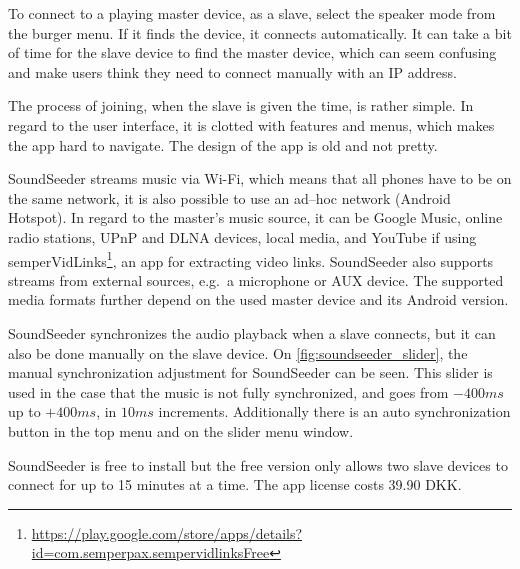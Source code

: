 To connect to a playing master device, as a slave, select the speaker mode from the burger menu.
If it finds the device, it connects automatically.
It can take a bit of time for the slave device to find the master device, which can seem confusing and make users think they need to connect manually with an IP address.

The process of joining, when the slave is given the time, is rather simple.
In regard to the user interface, it is clotted with features and menus, which makes the app hard to navigate.
The design of the app is old and not pretty.

SoundSeeder streams music via Wi-Fi,
which means that all phones have to be on the same network\cite{soundseether_faq}, it is also possible to use an ad--hoc network (Android Hotspot).
In regard to the master's music source, it can be Google Music, online radio stations, UPnP and DLNA devices, local media, and YouTube if using semperVidLinks\footnote{\url{https://play.google.com/store/apps/details?id=com.semperpax.sempervidlinksFree}}, an app for extracting video links.
SoundSeeder also supports streams from external sources, e.g.\ a microphone or AUX device.
The supported media formats further depend on the used master device and its Android version.\cite{soundseether_faq}

SoundSeeder synchronizes the audio playback when a slave connects, but it can also be done manually on the slave device.
On \cref{fig:soundseeder_slider}, the manual synchronization adjustment for SoundSeeder can be seen.
This slider is used in the case that the music is not fully synchronized, and goes from $-400 ms$ up to $+400 ms$, in $10 ms$ increments.
Additionally there is an auto synchronization button in the top menu and on the slider menu window.

SoundSeeder is free to install but the free version only allows two slave devices to connect for up to 15 minutes at a time.
The app license costs 39.90 DKK.

